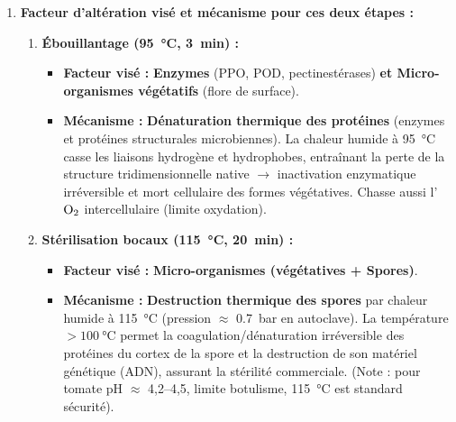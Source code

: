 \documentclass[11pt]{article}
\begin{document}
\begin{corrige}
\begin{enumerate}
\item \textbf{Facteur d'altération visé et mécanisme pour ces deux étapes :}
\begin{enumerate}
\item \textbf{Ébouillantage (\SI{95}{\degreeCelsius}, \SI{3}{\minute}) :}
\begin{itemize}
\item \textbf{Facteur visé :} \textbf{Enzymes} (PPO, POD, pectinestérases) \textbf{et Micro-organismes végétatifs} (flore de surface).
\item \textbf{Mécanisme :} \textbf{Dénaturation thermique des protéines} (enzymes et protéines structurales microbiennes). La chaleur humide à \SI{95}{\degreeCelsius} casse les liaisons hydrogène et hydrophobes, entraînant la perte de la structure tridimensionnelle native $\to$ inactivation enzymatique irréversible et mort cellulaire des formes végétatives. Chasse aussi l'$\ce{O2}$ intercellulaire (limite oxydation).
\end{itemize}
\item \textbf{Stérilisation bocaux (\SI{115}{\degreeCelsius}, \SI{20}{\minute}) :}
\begin{itemize}
\item \textbf{Facteur visé :} \textbf{Micro-organismes (végétatives + Spores)}.
\item \textbf{Mécanisme :} \textbf{Destruction thermique des spores} par chaleur humide à \SI{115}{\degreeCelsius} (pression $\approx$ \SI{0,7}{\bar} en autoclave). La température $> \SI{100}{\degreeCelsius}$ permet la coagulation/dénaturation irréversible des protéines du cortex de la spore et la destruction de son matériel génétique (ADN), assurant la stérilité commerciale. (Note : pour tomate pH $\approx$ 4,2--4,5, limite botulisme, \SI{115}{\degreeCelsius} est standard sécurité).
\end{itemize}
\end{enumerate}


\end{enumerate}
\end{corrige}
\end{document}
